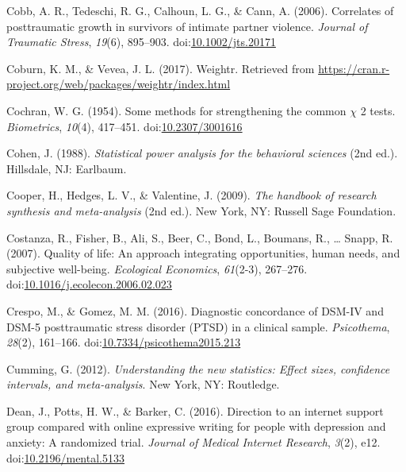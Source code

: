 \documentclass[,man]{apa6}
\begin{document}
\leavevmode\hypertarget{ref-Cobb2006}{}%
Cobb, A. R., Tedeschi, R. G., Calhoun, L. G., \& Cann, A. (2006). Correlates of posttraumatic growth in survivors of intimate partner violence. \emph{Journal of Traumatic Stress}, \emph{19}(6), 895--903. doi:\href{https://doi.org/10.1002/jts.20171}{10.1002/jts.20171}

\leavevmode\hypertarget{ref-Coburn2017}{}%
Coburn, K. M., \& Vevea, J. L. (2017). Weightr. Retrieved from \url{https://cran.r-project.org/web/packages/weightr/index.html}

\leavevmode\hypertarget{ref-Cochran1954}{}%
Cochran, W. G. (1954). Some methods for strengthening the common \(\chi\) 2 tests. \emph{Biometrics}, \emph{10}(4), 417--451. doi:\href{https://doi.org/10.2307/3001616}{10.2307/3001616}

\leavevmode\hypertarget{ref-Cohen1988}{}%
Cohen, J. (1988). \emph{Statistical power analysis for the behavioral sciences} (2nd ed.). Hillsdale, NJ: Earlbaum.

\leavevmode\hypertarget{ref-Cooper2009}{}%
Cooper, H., Hedges, L. V., \& Valentine, J. (2009). \emph{The handbook of research synthesis and meta-analysis} (2nd ed.). New York, NY: Russell Sage Foundation.

\leavevmode\hypertarget{ref-Costanza2007}{}%
Costanza, R., Fisher, B., Ali, S., Beer, C., Bond, L., Boumans, R., \ldots{} Snapp, R. (2007). Quality of life: An approach integrating opportunities, human needs, and subjective well-being. \emph{Ecological Economics}, \emph{61}(2-3), 267--276. doi:\href{https://doi.org/10.1016/j.ecolecon.2006.02.023}{10.1016/j.ecolecon.2006.02.023}

\leavevmode\hypertarget{ref-Crespo2016}{}%
Crespo, M., \& Gomez, M. M. (2016). Diagnostic concordance of DSM-IV and DSM-5 posttraumatic stress disorder (PTSD) in a clinical sample. \emph{Psicothema}, \emph{28}(2), 161--166. doi:\href{https://doi.org/10.7334/psicothema2015.213}{10.7334/psicothema2015.213}

\leavevmode\hypertarget{ref-Cumming2012}{}%
Cumming, G. (2012). \emph{Understanding the new statistics: Effect sizes, confidence intervals, and meta-analysis}. New York, NY: Routledge.

\leavevmode\hypertarget{ref-Dean2016}{}%
Dean, J., Potts, H. W., \& Barker, C. (2016). Direction to an internet support group compared with online expressive writing for people with depression and anxiety: A randomized trial. \emph{Journal of Medical Internet Research}, \emph{3}(2), e12. doi:\href{https://doi.org/10.2196/mental.5133}{10.2196/mental.5133}
\end{document}
